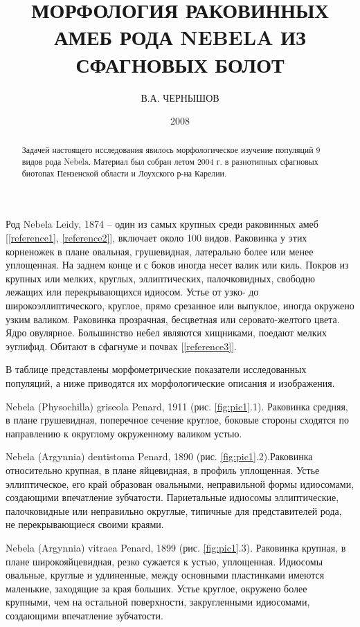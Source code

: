 \documentclass[12pt, a4paper]{article}
\title{МОРФОЛОГИЯ РАКОВИННЫХ АМЕБ РОДА NEBELA ИЗ СФАГНОВЫХ БОЛОТ}
\author{В.А. ЧЕРНЫШОВ}
\date{2008}
\begin{document}
\maketitle %
\begin{abstract}
Задачей настоящего исследования явилось морфологическое изучение популяций 9 видов рода Nebela. Материал был собран летом 2004 г. в разнотипных сфагновых биотопах Пензенской области и Лоухского р-на Карелии.
\end{abstract}

Род Nebela Leidy, 1874 – один из самых крупных среди раковинных амеб [\ref{reference1}, \ref{reference2}], включает около 100 видов. Раковинка у этих корненожек в плане овальная, грушевидная, латерально более или менее уплощенная. На заднем конце и с боков иногда несет валик или киль. Покров из крупных или мелких, круглых, эллиптических, палочковидных, свободно лежащих или перекрывающихся идиосом. Устье от узко- до широкоэллиптического, круглое, прямо срезанное или выпуклое, иногда окружено узким валиком. Раковинка прозрачная, бесцветная или серовато-желтого цвета. Ядро овулярное. Большинство небел являются хищниками, поедают мелких эуглифид. Обитают в сфагнуме и почвах [\ref{reference3}].

В таблице представлены морфометрические показатели исследованных популяций, а ниже приводятся их морфологические описания и изображения.

Nebela (Physochilla) griseola Penard, 1911 (рис. \ref{fig:pic1}.1). Раковинка средняя, в плане грушевидная, поперечное сечение круглое, боковые стороны сходятся по направлению к округлому окруженному валиком устью.

Nebela (Argynnia) dentistoma Penard, 1890 (рис. \ref{fig:pic1}.2).Раковинка относительно крупная, в плане яйцевидная, в профиль уплощенная. Устье эллиптическое, его край образован овальными, неправильной формы идиосомами, создающими впечатление зубчатости. Париетальные идиосомы эллиптические, палочковидные или неправильно округлые, типичные для представителей рода, не перекрывающиеся своими краями.

Nebela (Argynnia) vitraea Penard, 1899 (рис. \ref{fig:pic1}.3). Раковинка крупная, в плане широкояйцевидная, резко сужается к устью, уплощенная. Идиосомы овальные, круглые и удлиненные, между основными пластинками имеются маленькие, заходящие за края больших. Устье круглое, окружено более крупными, чем на остальной поверхности, закругленными идиосомами, создающими впечатление зубчатости.
\end{document}

